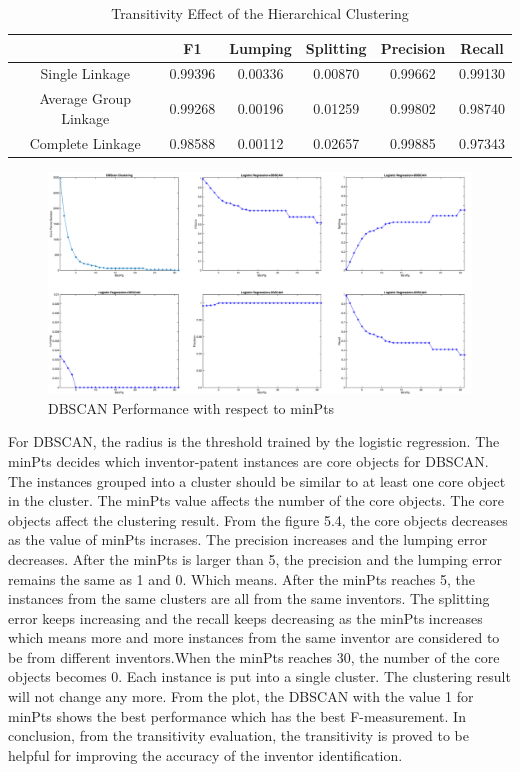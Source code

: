 \begin{table}
\centering
\begin{tabular}{|c|c|c|c|c|c|}
\hline
&F1&Lumping&Splitting&Precision&Recall\\
\hline
Single Linkage& 0.99396&0.00336 &0.00870 &0.99662 &0.99130 \\
\hline
Average Group Linkage&0.99268 &0.00196 & 0.01259& 0.99802& 0.98740\\
\hline
Complete Linkage&0.98588 & 0.00112 & 0.02657 &0.99885 &0.97343 \\
\hline
\end{tabular}
\caption{Transitivity Effect of the Hierarchical Clustering}
\end{table}
\begin{figure}
\centering
\includegraphics[scale=0.2]{DBSCANT.pdf}
\caption{DBSCAN Performance with respect to minPts}
\end{figure}

For DBSCAN, the radius is the threshold trained by the logistic regression. The minPts decides which inventor-patent instances are core objects for DBSCAN. The instances grouped into a cluster should be similar to at least one core object in the cluster. The minPts value affects the number of the core objects. The core objects affect the clustering result. From the figure 5.4, the core objects decreases as the value of minPts incrases. The precision increases and the lumping error decreases. After the minPts is larger than 5, the precision and the lumping error remains the same as 1 and 0. Which means. After the minPts reaches 5, the instances from the same clusters are all from the same inventors. The splitting error keeps increasing and the recall keeps decreasing as the minPts increases which means more and more instances from the same inventor are considered to be from different inventors.When the minPts reaches 30, the number of the core objects becomes 0. Each instance is put into a single cluster. The clustering result will not change any more. From the plot, the DBSCAN with the value 1 for minPts shows the best performance which has the best F-measurement. In conclusion, from the transitivity evaluation, the transitivity is proved to be helpful for improving the accuracy of the inventor identification.

